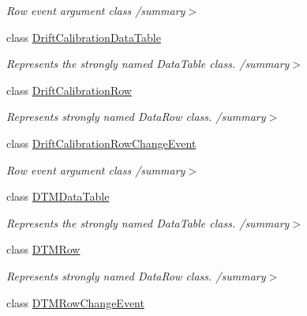 \begin{DoxyCompactItemize}
\begin{DoxyCompactList}\small\item\em Row event argument class /summary$>$ \end{DoxyCompactList}\item 
class \hyperlink{class_env_int_1_1_win32_1_1_field_tech_1_1_manager_1_1_data_sets_1_1_guide_ware_mobile_data_set_588dc56dc32786e9aa4e1136d4400333}{Drift\+Calibration\+Data\+Table}
\begin{DoxyCompactList}\small\item\em Represents the strongly named Data\+Table class. /summary$>$ \end{DoxyCompactList}\item 
class \hyperlink{class_env_int_1_1_win32_1_1_field_tech_1_1_manager_1_1_data_sets_1_1_guide_ware_mobile_data_set_1_1_drift_calibration_row}{Drift\+Calibration\+Row}
\begin{DoxyCompactList}\small\item\em Represents strongly named Data\+Row class. /summary$>$ \end{DoxyCompactList}\item 
class \hyperlink{class_env_int_1_1_win32_1_1_field_tech_1_1_manager_1_1_data_sets_1_1_guide_ware_mobile_data_set_aa92b3413cef1716fa2c99ea466ba9d7}{Drift\+Calibration\+Row\+Change\+Event}
\begin{DoxyCompactList}\small\item\em Row event argument class /summary$>$ \end{DoxyCompactList}\item 
class \hyperlink{class_env_int_1_1_win32_1_1_field_tech_1_1_manager_1_1_data_sets_1_1_guide_ware_mobile_data_set_1_1_d_t_m_data_table}{D\+T\+M\+Data\+Table}
\begin{DoxyCompactList}\small\item\em Represents the strongly named Data\+Table class. /summary$>$ \end{DoxyCompactList}\item 
class \hyperlink{class_env_int_1_1_win32_1_1_field_tech_1_1_manager_1_1_data_sets_1_1_guide_ware_mobile_data_set_1_1_d_t_m_row}{D\+T\+M\+Row}
\begin{DoxyCompactList}\small\item\em Represents strongly named Data\+Row class. /summary$>$ \end{DoxyCompactList}\item 
class \hyperlink{class_env_int_1_1_win32_1_1_field_tech_1_1_manager_1_1_data_sets_1_1_guide_ware_mobile_data_set_1_1_d_t_m_row_change_event}{D\+T\+M\+Row\+Change\+Event}

\end{DoxyCompactItemize}
